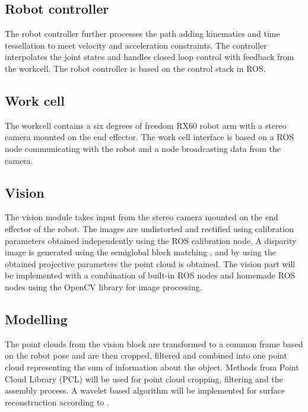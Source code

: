 \subsection{Robot controller}
The robot controller further processes the path adding kinematics and time tessellation to meet velocity and acceleration constraints. The controller interpolates the joint states and handles closed loop control with feedback from the workcell. The robot controller is based on the control stack in ROS.

\subsection{Work cell}
The workcell contains a six degrees of freedom RX60 robot arm with a stereo camera mounted on the end effector. The work cell interface is based on a ROS node communicating with the robot and a node broadcasting data from the camera.

\subsection{Vision}
The vision module takes input from the stereo camera mounted on the end effector of the robot. The images are undistorted and rectified using calibration parameters obtained independently using the ROS calibration node. A disparity image is generated using the semiglobal block matching \cite{Hirschmuller2008}, and by using the obtained projective parameters the point cloud is obtained. The vision part will be implemented with a combination of built-in ROS nodes and homemade ROS nodes using the OpenCV library for image processing.

\subsection{Modelling}
The point clouds from the vision block are transformed to a common frame based on the robot pose and are then cropped, filtered and combined into one point cloud representing the sum of information about the object. Methods from Point Cloud Library (PCL) will be used for point cloud cropping, filtering and the assembly process. A wavelet based algorithm will be implemented for surface reconstruction according to \cite{Manson2008}.
